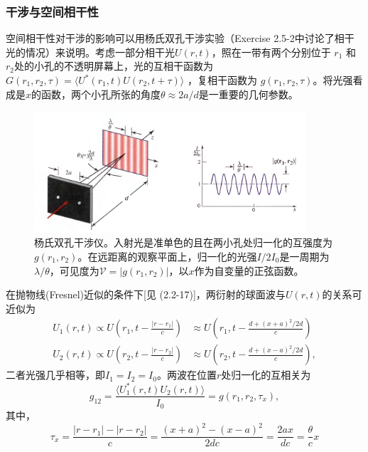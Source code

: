 \documentclass[UTF8]{ctexart}
\numberwithin{figure}{subsection}
\numberwithin{table}{subsection}
\begin{document}
\subsubsection{干涉与空间相干性}
\endgroup
空间相干性对干涉的影响可以用杨氏双孔干涉实验（Exercise 2.5-2中讨论了相干光的情况）来说明。考虑一部分相干光$ U(r,t) $，照在一带有两个分别位于 $ r_1 $ 和 $ r_2 $处的小孔的不透明屏幕上，光的互相干函数为 $ G(r_1, r_2, \tau) = \langle U^\ast(r_1, t) U(r_2, t+\tau) \rangle $ ，复相干函数为 $ g(r_1, r_2, \tau) $。将光强看成是$x$的函数，两个小孔所张的角度$ \theta \approx 2a / d $是一重要的几何参数。
 \begin{figure}[H]
\centering
\includegraphics[width=0.9\textwidth]{11_2_4.PNG}
\caption{杨氏双孔干涉仪。入射光是准单色的且在两小孔处归一化的互强度为 $ g(r_1, r_2) $。在远距离的观察平面上，归一化的光强$ I / 2 I_0 $是一周期为$\lambda / \theta $，可见度为$ \mathcal{V} = \lvert g(r_1, r_2) \rvert $，以$x$作为自变量的正弦函数。}
\label{fig: 11_2_4}
\end{figure}
\par 在抛物线(Fresnel)近似的条件下[见 (2.2-17)]，两衍射的球面波与$ U(r, t) $的关系可近似为
\begin{subequations}
\begin{align}
U_1 (r, t) \propto U(r_1, t - \frac{\lvert r- r_1 \rvert}{c})  &\approx U(r_1, t - \frac{d + (x+a)^2 / 2d}{c})\\
U_2 (r, t) \propto U(r_2, t - \frac{\lvert r- r_2 \rvert}{c})  &\approx U(r_2, t - \frac{d + (x-a)^2 / 2d}{c}),
\end{align}
\end{subequations} 
二者光强几乎相等，即$ I_1 = I_2 = I_0 $。两波在位置$r$处归一化的互相关为
\begin{equation}
g_{12} = \frac{\langle U_1^\ast (r, t) U_2 (r, t) \rangle}{I_0} = g(r_1, r_2, \tau_x),
\end{equation}
其中，
\begin{equation}
\tau_x = \frac{\lvert r - r_1 \rvert - \lvert r - r_2 \rvert}{c} = \frac{(x + a)^2 - (x - a)^2}{2dc} = \frac{2ax}{dc} = \frac{\theta}{c}x
\end{equation}
\end{document}
